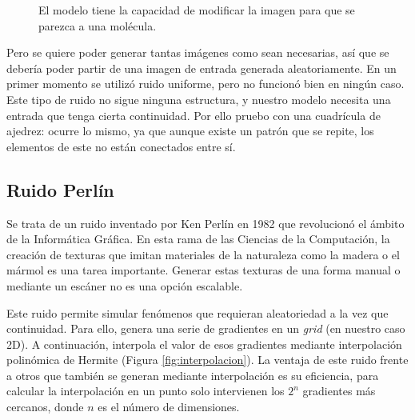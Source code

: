 \begin{figure}[H]
\centering
    \caption{El modelo tiene la capacidad de modificar la imagen para que se parezca a una molécula.}
    \label{fig:circle-hex}
\end{figure}

Pero se quiere poder generar tantas imágenes como sean necesarias, así que se debería poder partir de una imagen de entrada generada aleatoriamente. En un primer momento se utilizó ruido uniforme, pero no funcionó bien en ningún caso. Este tipo de ruido no sigue ninguna estructura, y nuestro modelo necesita una entrada que tenga cierta continuidad. Por ello pruebo con una cuadrícula de ajedrez: ocurre lo mismo, ya que aunque existe un patrón que se repite, los elementos de este no están conectados entre sí.

\subsection{Ruido Perlín}
Se trata de un ruido inventado por Ken Perlín en 1982 que revolucionó el ámbito de la Informática Gráfica. En esta rama de las Ciencias de la Computación, la creación de texturas que imitan materiales de la naturaleza como la madera o el mármol es una tarea importante. Generar estas texturas de una forma manual o mediante un escáner no es una opción escalable.

Este ruido permite simular fenómenos que requieran aleatoriedad a la vez que continuidad. Para ello, genera una serie de gradientes en un \textit{grid} (en nuestro caso 2D). A continuación, interpola el valor de esos gradientes mediante interpolación polinómica de Hermite (Figura \ref{fig:interpolacion}). La ventaja de este ruido frente a otros que también se generan mediante interpolación es su eficiencia, para calcular la interpolación en un punto solo intervienen los $2^n$ gradientes más cercanos, donde $n$ es el número de dimensiones. \cite{computer-graphics-epfl}

